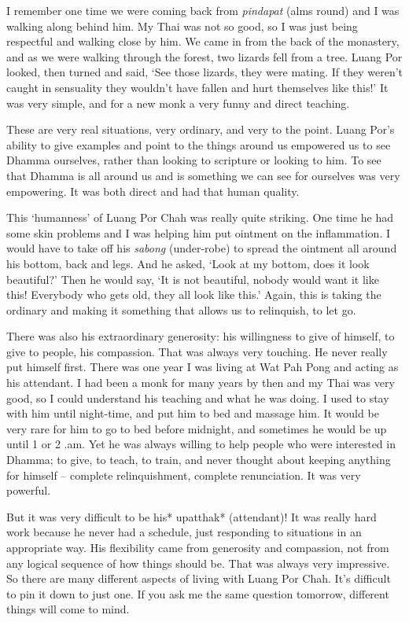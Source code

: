 I remember one time we were coming back from \emph{pindapat} (alms
round) and I was walking along behind him. My Thai was not so good, so I
was just being respectful and walking close by him. We came in from the
back of the monastery, and as we were walking through the forest, two
lizards fell from a tree. Luang Por looked, then turned and said, `See
those lizards, they were mating. If they weren't caught in sensuality
they wouldn't have fallen and hurt themselves like this!' It was very
simple, and for a new monk a very funny and direct teaching.

These are very real situations, very ordinary, and very to the point.
Luang Por's ability to give examples and point to the things around us
empowered us to see Dhamma ourselves, rather than looking to scripture
or looking to him. To see that Dhamma is all around us and is something
we can see for ourselves was very empowering. It was both direct and had
that human quality.

This `humanness' of Luang Por Chah was really quite striking. One time
he had some skin problems and I was helping him put ointment on the
inflammation. I would have to take off his \emph{sabong} (under-robe) to
spread the ointment all around his bottom, back and legs. And he asked,
`Look at my bottom, does it look beautiful?' Then he would say, `It is
not beautiful, nobody would want it like this! Everybody who gets old,
they all look like this.' Again, this is taking the ordinary and making
it something that allows us to relinquish, to let go.

There was also his extraordinary generosity: his willingness to give of
himself, to give to people, his compassion. That was always very
touching. He never really put himself first. There was one year I was
living at Wat Pah Pong and acting as his attendant. I had been a monk
for many years by then and my Thai was very good, so I could understand
his teaching and what he was doing. I used to stay with him until
night-time, and put him to bed and massage him. It would be very rare
for him to go to bed before midnight, and sometimes he would be up until
1 or 2 .am. Yet he was always willing to help people who were interested
in Dhamma; to give, to teach, to train, and never thought about keeping
anything for himself -- complete relinquishment, complete renunciation.
It was very powerful.

But it was very difficult to be his* upatthak* (attendant)! It was
really hard work because he never had a schedule, just responding to
situations in an appropriate way. His flexibility came from generosity
and compassion, not from any logical sequence of how things should be.
That was always very impressive. So there are many different aspects of
living with Luang Por Chah. It's difficult to pin it down to just one.
If you ask me the same question tomorrow, different things will come to
mind.

